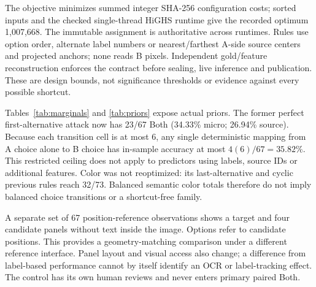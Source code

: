 \documentclass[10pt,twocolumn,letterpaper]{article}
\begin{document}
The objective minimizes summed integer SHA-256 configuration costs;
sorted inputs and the checked single-thread HiGHS runtime give the
recorded optimum 1,007,668. The immutable assignment is authoritative
across runtimes. Rules use option order, alternate label numbers or
nearest/farthest A-side source centers and projected anchors; none reads
B pixels. Independent gold/feature reconstruction enforces the contract
before sealing, live inference and publication. These are design bounds,
not significance thresholds or evidence against every possible shortcut.

Tables~\ref{tab:marginals} and \ref{tab:priors} expose actual priors.
The former perfect first-alternative attack now has 23/67 Both
(34.33\% micro; 26.94\% source). Because each transition cell is at most
6, any single deterministic mapping from A choice alone to B choice has
in-sample accuracy at most $4(6)/67=35.82\%$. This restricted ceiling
does not apply to predictors using labels, source IDs or additional
features. Color was not reoptimized: its last-alternative and cyclic
previous rules reach 32/73. Balanced semantic color totals therefore
do not imply balanced choice transitions or a shortcut-free family.

\begin{table}[t]
\centering\small
\caption{Choice-ID gold counts beside the planned experiment inventory.
Color is frozen; only Part-type was optimized. Both families cover
24 sources. Actual human qualification is 0/280 primary endpoints.}
\label{tab:marginals}

\end{table}

\begin{table}[t]
\centering\small
\caption{Deterministic B accuracy (\%), micro and equal-source.
$^\dagger$Oracle supplies correct A; these rules read no B image, so
their B accuracy equals Both. Fixed choices have Both=0. These
are stimulus audits, not learned-model scores. All 13 Part-type
oracle rules, intervals and individual errors are released.}
\label{tab:priors}
\setlength{\tabcolsep}{4pt}

\end{table}

A separate set of 67 position-reference observations shows a target
and four candidate panels without text inside the image. Options
refer to candidate positions. This provides a geometry-matching
comparison under a different reference interface. Panel layout and
visual access also change; a difference from label-based performance
cannot by itself identify an OCR or label-tracking effect. The control
has its own human reviews and never enters primary paired Both.
\end{document}
